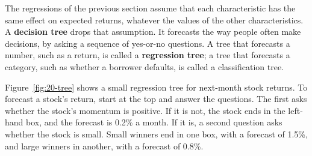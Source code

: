 The regressions of the previous section assume that each characteristic has the same effect on expected returns, whatever the values of the other characteristics. A \textbf{decision tree} drops that assumption. It forecasts the way people often make decisions, by asking a sequence of yes-or-no questions. A tree that forecasts a number, such as a return, is called a \textbf{regression tree}; a tree that forecasts a category, such as whether a borrower defaults, is called a classification tree.

Figure~\ref{fig:20-tree} shows a small regression tree for next-month stock returns. To forecast a stock's return, start at the top and answer the questions. The first asks whether the stock's momentum is positive. If it is not, the stock ends in the left-hand box, and the forecast is 0.2\% a month. If it is, a second question asks whether the stock is small. Small winners end in one box, with a forecast of 1.5\%, and large winners in another, with a forecast of 0.8\%.


